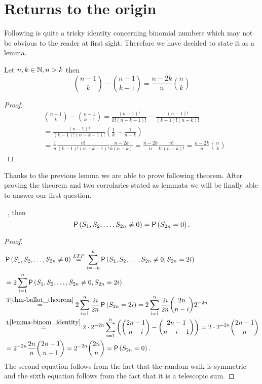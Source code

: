 \chapter{Returns to the origin}
\begin{rem}
  Following is quite a tricky identity concerning binomial numbers which may not be obvious to the reader at first sight. Therefore we have decided to state it as a lemma.
\end{rem}
\begin{lemma}\label{lemma-binom_identity}
 Let $n,k \in \mathbb{N}, n>k$ then
 \[
 \binom{n-1}{k}-\binom{n-1}{k-1}=\frac{n-2k}{n}\binom{n}{k}
 \]
\end{lemma}
\begin{proof}
  \[
  \begin{split}
    & \binom{n-1}{k}-\binom{n-1}{k-1}
     =\frac{ \left( n-1 \right) !}{k! \left( n-k-1 \right) !}-\frac{ \left( n-1 \right) !}{ \left( k-1 \right) ! \left( n-k \right) !}\\
    & =\frac{ \left( n-1 \right) !}{ \left( k-1 \right) ! \left( n-k-1 \right) !} \left( \frac{1}{k}-\frac{1}{n-k} \right)\\
    & =\frac{1}{n}\frac{n!}{ \left( k-1 \right) ! \left( n-k-1 \right) !}\frac{n-2k}{k \left( n-k \right) }
    =\frac{n-2k}{n}\frac{n!}{k! \left( n-k \right) !}=\frac{n-2k}{n}\binom{n}{k}
     \end{split}
  \]
\end{proof}
\begin{rem}
  Thanks to the previous lemma we are able to prove following theorem. After proving the theorem and two corrolaries stated as lemmata we will be finally able to answer our first question.
\end{rem}
\begin{thm}\label{thm-no_return=return}
 \Lrws\ , then
 \[
   \operatorname{\mathsf{P}} \left( S_1, S_2, \ldots, S_{2n}\neq 0 \right) =\operatorname{\mathsf{P}} \left( S_{2n}=0 \right).
  \]
\end{thm}
\begin{proof}
  \[
  \begin{split}
    & \pr \left(S_1, S_2, \ldots, S_{2n}\neq 0 \right)
    \ltp \suma[i][-n][n] \pr \left( S_1 , S_2, \ldots, S_{2n}\neq 0, S_{2n}=2i \right)\\
    & =2\suma \pr \left( S_1 , S_2, \ldots, S_{2n}\neq 0, S_{2n}=2i \right)\\
    & \overset{\text{T}\ref{thm-ballot_theorem}}{=}2\suma \frac{2i}{2n}\pr \left( S_{2n}=2i \right) =2\suma \frac{2i}{2n}\binom{2n}{n-i}2^{-2n}\\
    & \overset{\text{L}\ref{lemma-binom_identity}}{=} 2\cdot 2^{-2n}\suma \left( \binom{2n-1}{n-i}-\binom{2n-1}{n-i-1} \right) =2\cdot 2^{-2n}\binom{2n-1}{n}\\
    &=2^{-2n}\frac{2n}{n}\binom{2n-1}{n-1}
  =2^{-2n}\binom{2n}{n}=\pr \left( S_{2n}=0 \right).
  \end{split}
  \]
  The second equation follows from the fact that the random walk is symmetric and the sixth equation follows from the fact that it is a telescopic sum.
\end{proof}



